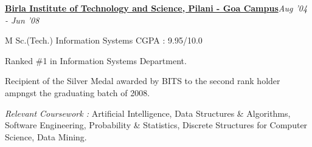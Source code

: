 \documentclass[10pt]{article}
\newenvironment{innerlist}[1][\enskip\textbullet]%
        {\begin{compactitem}[#1]}{\end{compactitem}}
\newcommand{\blankline}{\vspace{0.10cm}}
\begin{document}
\blankline

\href{http://www.bits-goa.ac.in/}{\textbf{Birla Institute of Technology and Science, Pilani - Goa Campus}}\hfill \textit{Aug '04 - Jun '08}
\begin{innerlist}
\item[] M Sc.(Tech.) {Information Systems} \hfill{CGPA : 9.95/10.0}
        \begin{innerlist}
        \item Ranked \#1 in Information Systems Department.
        \item Recipient of the Silver Medal awarded by BITS to the second rank holder ampngst the graduating batch of 2008.
        \item \emph{Relevant Coursework : }Artificial Intelligence, Data Structures \& Algorithms, Software Engineering, Probability \& Statistics, Discrete Structures for Computer Science, Data Mining.
        \end{innerlist}
\end{innerlist}
\end{document}
